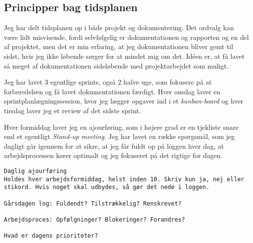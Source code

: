 \subsection{Principper bag tidsplanen}

Jeg har delt tidsplanen op i både projekt og dokumentering. Det ordvalg kan være lidt misvisende, fordi selvfølgelig er dokumentationen og rapporten og en del af projektet, men det er min erfaring, at jeg dokumentationen bliver gemt til sidst, hvis jeg ikke løbende sørger for at mindet mig om det. Idéen er, at få lavet så meget af dokumentationen sideløbende med projektarbejdet som muligt.\par{}
Jeg har lavet 3 egentlige sprints, også 2 halve uge, som fokusere på at forberedelsen og få lavet dokumentationen færdigt.
Hver onsdag laver en sprintplanlægningssession, hvor jeg lægger opgaver ind i et \textit{kanban-board} og hver tirsdag laver jeg et review af det sidste sprint.\par{}
Hver formiddag laver jeg en ajourføring, som i højere grad er en tjekliste snare end et egentligt \textit{Stand-up meeting}. Jeg har lavet en række spørgsmål, som jeg dagligt går igennem for at sikre, at jeg får fuldt op på loggen hver dag, at arbejdsprocessen kører optimalt og jeg fokuseret på det rigtige for dagen.

\begin{lstlisting}
Daglig ajourføring
Holdes hver arbejdsformiddag, helst inden 10. Skriv kun ja, nej eller stikord. Hvis noget skal udbydes, så gør det nede i loggen.

Gårsdagen log: Fuldendt? Tilstrækkelig? Renskrevet?

Arbejdsproces: Opfølgninger? Blokeringer? Forandres?

Hvad er dagens prioriteter?
\end{lstlisting}
